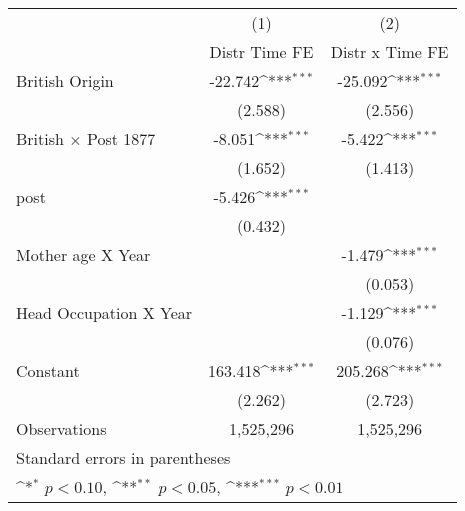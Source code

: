 {
\def\sym#1{\ifmmode^{#1}\else\(^{#1}\)\fi}
\begin{tabular}{l*{2}{c}}
\hline\hline
                    &\multicolumn{1}{c}{(1)}&\multicolumn{1}{c}{(2)}\\
                    &\multicolumn{1}{c}{Distr Time FE}&\multicolumn{1}{c}{Distr x Time FE}\\
\hline
British Origin      &     -22.742\sym{***}&     -25.092\sym{***}\\
                    &     (2.588)         &     (2.556)         \\
[1em]
British $\times$ Post 1877&      -8.051\sym{***}&      -5.422\sym{***}\\
                    &     (1.652)         &     (1.413)         \\
[1em]
post                &      -5.426\sym{***}&                     \\
                    &     (0.432)         &                     \\
[1em]
Mother age X Year   &                     &      -1.479\sym{***}\\
                    &                     &     (0.053)         \\
[1em]
Head Occupation X Year&                     &      -1.129\sym{***}\\
                    &                     &     (0.076)         \\
[1em]
Constant            &     163.418\sym{***}&     205.268\sym{***}\\
                    &     (2.262)         &     (2.723)         \\
\hline
Observations        &   1,525,296         &   1,525,296         \\
\hline\hline
\multicolumn{3}{l}{\footnotesize Standard errors in parentheses}\\
\multicolumn{3}{l}{\footnotesize \sym{*} \(p<0.10\), \sym{**} \(p<0.05\), \sym{***} \(p<0.01\)}\\
\end{tabular}
}
